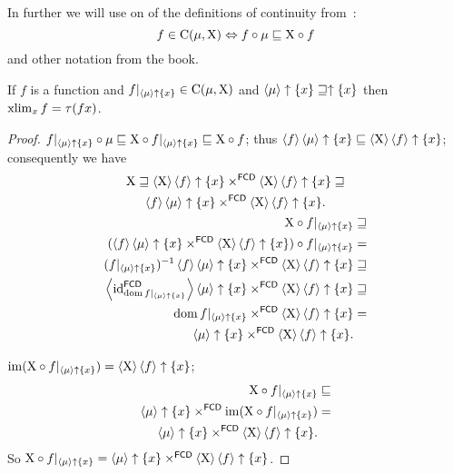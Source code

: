 In further we will use on of the definitions of continuity from~\cite{volume-1-edition1}:
\[ f\in\mathrm{C}(\mu,\mathrm{X})\Leftrightarrow
f\circ\mu \sqsubseteq \mathrm{X}\circ f \]
and other notation from the book.

\begin{thm}
If $f$ is a function and $f|_{\left\langle \mu\right\rangle\uparrow\{x\}}\in\mathrm{C}(\mu,\mathrm{X})$
and $\left\langle \mu\right\rangle\uparrow\{x\}\sqsupseteq\uparrow\{x\}$
then $\operatorname{xlim}_{x}f=\tau(fx)$.\end{thm}

\begin{proof}
$f|_{\left\langle \mu\right\rangle\uparrow\{x\}}\circ\mu\sqsubseteq\mathrm{X}\circ f|_{\left\langle \mu\right\rangle\uparrow\{x\}}\sqsubseteq\mathrm{X}\circ f$;
thus $\langle f\rangle\left\langle \mu\right\rangle\uparrow\{x\}\sqsubseteq\left\langle \mathrm{X}\right\rangle\left\langle f\right\rangle\uparrow\{x\}$;
consequently we have
\begin{gather*}
\mathrm{X}\sqsupseteq\left\langle \mathrm{X}\right\rangle\left\langle f\right\rangle\uparrow\{x\}\times^{\mathsf{FCD}}\left\langle \mathrm{X}\right\rangle\left\langle f\right\rangle\uparrow\{x\}\sqsupseteq\\\left\langle f\right\rangle\left\langle \mu\right\rangle\uparrow\{x\}\times^{\mathsf{FCD}}\left\langle \mathrm{X}\right\rangle\left\langle f\right\rangle\uparrow\{x\}.\\
\begin{aligned}\mathrm{X}\circ f|_{\left\langle \mu\right\rangle\uparrow\{x\}} & \sqsupseteq\\
(\left\langle f\right\rangle\left\langle \mu\right\rangle\uparrow\{x\}\times^{\mathsf{FCD}}\left\langle \mathrm{X}\right\rangle\left\langle f\right\rangle\uparrow\{x\})\circ f|_{\left\langle \mu\right\rangle\uparrow\{x\}} & =\\
(f|_{\left\langle \mu\right\rangle\uparrow\{x\}})^{-1}\left\langle f\right\rangle\left\langle \mu\right\rangle\uparrow\{x\}\times^{\mathsf{FCD}}\left\langle \mathrm{X}\right\rangle\left\langle f\right\rangle\uparrow\{x\} & \sqsupseteq\\
\left\langle \operatorname{id}_{\operatorname{dom} f|_{\left\langle \mu\right\rangle\uparrow\{x\}}}^{\mathsf{FCD}}\right\rangle\left\langle \mu\right\rangle\uparrow\{x\}\times^{\mathsf{FCD}}\left\langle \mathrm{X}\right\rangle\left\langle f\right\rangle\uparrow\{x\} & \sqsupseteq\\
\operatorname{dom} f|_{\left\langle \mu\right\rangle\uparrow\{x\}}\times^{\mathsf{FCD}}\left\langle \mathrm{X}\right\rangle\left\langle f\right\rangle\uparrow\{x\} & =\\
\left\langle \mu\right\rangle\uparrow\{x\}\times^{\mathsf{FCD}}\left\langle \mathrm{X}\right\rangle\left\langle f\right\rangle\uparrow\{x\}.
\end{aligned}
\end{gather*}


$\operatorname{im}(\mathrm{X}\circ f|_{\left\langle \mu\right\rangle\uparrow\{x\}})=\left\langle \mathrm{X}\right\rangle\left\langle f\right\rangle\uparrow\{x\}$;
\begin{align*}
\mathrm{X}\circ f|_{\left\langle \mu\right\rangle\uparrow\{x\}} & \sqsubseteq\\
\left\langle \mu\right\rangle\uparrow\{x\}\times^{\mathsf{FCD}}\operatorname{im}(\mathrm{X}\circ f|_{\left\langle \mu\right\rangle\uparrow\{x\}}) & =\\
\left\langle \mu\right\rangle\uparrow\{x\}\times^{\mathsf{FCD}}\left\langle \mathrm{X}\right\rangle\left\langle f\right\rangle\uparrow\{x\}.
\end{align*}
So $\mathrm{X}\circ f|_{\left\langle \mu\right\rangle\uparrow\{x\}}=\left\langle \mu\right\rangle\uparrow\{x\}\times^{\mathsf{FCD}}\left\langle \mathrm{X}\right\rangle\left\langle f\right\rangle\uparrow\{x\}$.


\end{proof}
